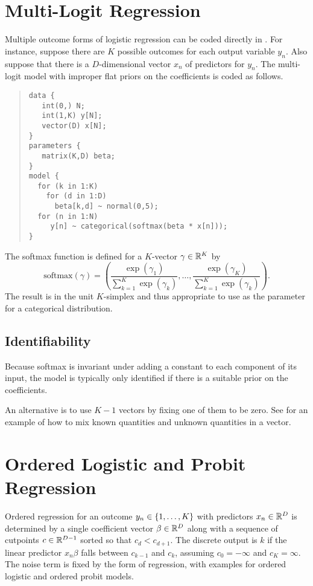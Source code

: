 \section{Multi-Logit Regression}

Multiple outcome forms of logistic regression can be coded directly in
\Stan.  For instance, suppose there are $K$ possible outcomes for each
output variable $y_n$.  Also suppose that there is a $D$-dimensional
vector $x_n$ of predictors for $y_n$.  The multi-logit model with
improper flat priors on the coefficients is coded as follows.
%
\begin{quote}
\begin{Verbatim}
data {
   int(0,) N;
   int(1,K) y[N];
   vector(D) x[N];
}
parameters {
   matrix(K,D) beta;
}
model {
  for (k in 1:K)
    for (d in 1:D)
      beta[k,d] ~ normal(0,5);
  for (n in 1:N)
     y[n] ~ categorical(softmax(beta * x[n]));
}
\end{Verbatim}
\end{quote}
%
The softmax function is defined for a $K$-vector $\gamma \in \mathbb{R}^K$ by
\[
\mbox{softmax}(\gamma) = 
\left(
 \frac{\exp(\gamma_1)}
      {\sum_{k=1}^K \exp(\gamma_k)},
  \ldots,
  \frac{\exp(\gamma_K)}
       {\sum_{k=1}^K \exp(\gamma_k)}
\right).
\]
%
The result is in the unit $K$-simplex and thus appropriate to use as
the parameter for a categorical distribution.

\subsection{Identifiability}

Because softmax is invariant under adding a constant to each component
of its input, the model is typically only identified if there is a
suitable prior on the coefficients.

An alternative is to use $K-1$ vectors by fixing one of them to be
zero.  See  for an example of
how to mix known quantities and unknown quantities in a vector.


\section{Ordered Logistic and Probit Regression}\label{ordered-logistic.section}

Ordered regression for an outcome $y_n \in \{ 1,\ldots,K \}$ with
predictors $x_n \in \mathbb{R}^D$ is determined by a single coefficient
vector $\beta \in \mathbb{R}^D$ along with a sequence of cutpoints $c \in
\mathbb{R}^{D-1}$ sorted so that $c_d < c_{d+1}$.  The discrete output is
$k$ if the linear predictor $x_n \beta$ falls between $c_{k-1}$ and
$c_k$, assuming $c_0 = -\infty$ and $c_K = \infty$.  The noise term is
fixed by the form of regression, with examples for ordered logistic
and ordered probit models.  

